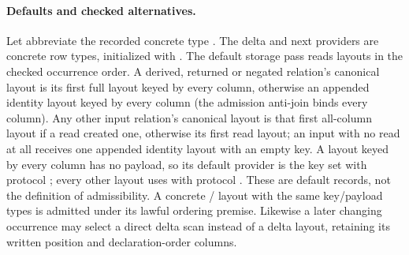 \paragraph{Defaults and checked alternatives.} Let  abbreviate the
recorded concrete type
.
The delta and next providers are concrete  row types,
initialized with . The default storage pass reads
layouts in the checked occurrence order. A derived, returned or negated
relation's canonical layout is its first full layout keyed by every column,
otherwise an appended identity layout keyed by every column (the admission
anti-join binds every column). Any other input relation's canonical layout
is that first all-column layout if a read created one, otherwise its first
read layout; an input with no read at all receives one appended identity
layout with an empty key.
A layout keyed by every column has no payload, so its default provider is the
key set  with protocol ;
every other layout uses  with
protocol . These are default records, not
the definition of admissibility. A concrete /
layout with the same key/payload types is admitted under its lawful ordering premise.
Likewise a later changing occurrence may select a direct delta scan instead
of a delta layout, retaining its written position and declaration-order columns.

